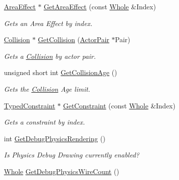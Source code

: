 \begin{DoxyCompactItemize}
\hyperlink{classMezzanine_1_1AreaEffect}{AreaEffect} $\ast$ \hyperlink{classMezzanine_1_1PhysicsManager_a648b109c3e2cf4436f492f5fce455878}{GetAreaEffect} (const \hyperlink{namespaceMezzanine_adcbb6ce6d1eb4379d109e51171e2e493}{Whole} \&Index)
\begin{DoxyCompactList}\small\item\em Gets an Area Effect by index. \item\end{DoxyCompactList}\item 
\hyperlink{classMezzanine_1_1Collision}{Collision} $\ast$ \hyperlink{classMezzanine_1_1PhysicsManager_a1beaefec6bea378a93ee40e0ef0f3f0a}{GetCollision} (\hyperlink{classMezzanine_1_1ActorPair}{ActorPair} $\ast$Pair)
\begin{DoxyCompactList}\small\item\em Gets a \hyperlink{classMezzanine_1_1Collision}{Collision} by actor pair. \item\end{DoxyCompactList}\item 
unsigned short int \hyperlink{classMezzanine_1_1PhysicsManager_aa9e127b310b017f72ca70fc12255ba97}{GetCollisionAge} ()
\begin{DoxyCompactList}\small\item\em Gets the \hyperlink{classMezzanine_1_1Collision}{Collision} Age limit. \item\end{DoxyCompactList}\item 
\hyperlink{classMezzanine_1_1TypedConstraint}{TypedConstraint} $\ast$ \hyperlink{classMezzanine_1_1PhysicsManager_a2b96309bee2a20bb5c05ceda44baff0c}{GetConstraint} (const \hyperlink{namespaceMezzanine_adcbb6ce6d1eb4379d109e51171e2e493}{Whole} \&Index)
\begin{DoxyCompactList}\small\item\em Gets a constraint by index. \item\end{DoxyCompactList}\item 
int \hyperlink{classMezzanine_1_1PhysicsManager_a3dc5dbf00d4a6567561ea6fbf63da49d}{GetDebugPhysicsRendering} ()
\begin{DoxyCompactList}\small\item\em Is Physics Debug Drawing currently enabled? \item\end{DoxyCompactList}\item 
\hyperlink{namespaceMezzanine_adcbb6ce6d1eb4379d109e51171e2e493}{Whole} \hyperlink{classMezzanine_1_1PhysicsManager_a04e47cd46c50c979026a801caac1020c}{GetDebugPhysicsWireCount} ()

\end{DoxyCompactItemize}
